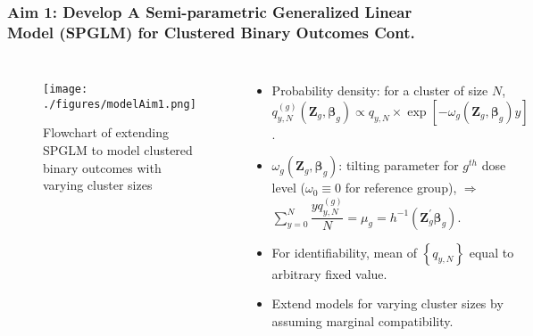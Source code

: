 \documentclass[hyperref={bookmarks=false},aspectratio=169]{beamer}
\begin{document}
\begin{frame}
\frametitle{Aim 1: Develop A Semi-parametric Generalized Linear Model (SPGLM) for Clustered Binary Outcomes Cont.}

\begin{columns}


\begin{figure}
    \centering
    \texttt{[image: ./figures/modelAim1.png]}
    \caption{Flowchart of extending SPGLM to model clustered binary outcomes with varying cluster sizes}
    \label{fig:Aim12}
\end{figure}

\begin{itemize}
    \item \alert{Probability density}: for a cluster of size $N$, $ q_{y,N}^{(g)} \left( \boldsymbol{Z}_g, \boldsymbol{\beta}_g \right) \propto q_{y,N} \times \exp{ \left[ - \omega_g(\boldsymbol{Z}_g, \boldsymbol{\beta}_g) y \right]} $.
    \item $\omega_g(\boldsymbol{Z}_g, \boldsymbol{\beta}_g)$: tilting parameter for $g^{th}$ dose level ($\omega_0 \equiv 0$ for reference group), $\Longrightarrow$ $\displaystyle \sum_{y=0}^N \dfrac{y q_{y,N}^{(g)}}{N} = \mu_g = h^{-1}\left( \boldsymbol{Z}_g^{'} \boldsymbol{\beta}_g \right)$.
    \item For identifiability, mean of $\left\lbrace q_{y,N}\right\rbrace$ equal to arbitrary fixed value.
    \item \alert{Extend models for varying cluster sizes by assuming marginal compatibility}.
\end{itemize}

\end{columns}
\end{frame}
\end{document}
